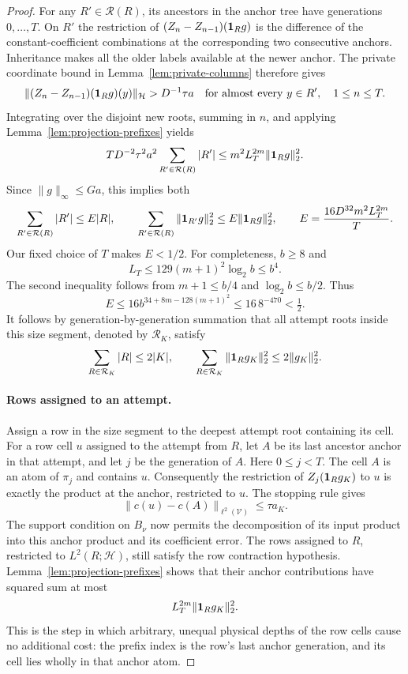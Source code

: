 \begin{proof}
For any $R'\in\mathcal R(R)$, its ancestors in the anchor tree have
generations $0,\ldots,T$.  On $R'$ the restriction of
$(Z_n-Z_{n-1})(\mathbf 1_Rg)$ is the difference of the constant-coefficient
combinations at the corresponding two consecutive anchors.  Inheritance
makes all the older labels available at the newer anchor.  The private
coordinate bound in Lemma~\ref{lem:private-columns} therefore gives
\[
 \|(Z_n-Z_{n-1})(\mathbf 1_Rg)(y)\|_{\mathcal H}
         >D^{-1}\tau a
 \quad\text{for almost every }y\in R',\quad 1\le n\le T.
\]
Integrating over the disjoint new roots, summing in $n$, and applying
Lemma~\ref{lem:projection-prefixes} yields
\[
 T D^{-2}\tau^2a^2\sum_{R'\in\mathcal R(R)}|R'|
        \le m^2L_T^{2m}\|\mathbf 1_Rg\|_2^2.
\]
Since $\|g\|_\infty\le Ga$, this implies both
\[
 \sum_{R'\in\mathcal R(R)}|R'|\le E|R|,
 \qquad
 \sum_{R'\in\mathcal R(R)}\|\mathbf 1_{R'}g\|_2^2
       \le E\|\mathbf 1_Rg\|_2^2,
 \qquad
 E=\frac{16D^{32}m^2L_T^{2m}}{T}.
\]
Our fixed choice of $T$ makes $E<1/2$.  For completeness, $b\ge8$ and
\[
 L_T\le129(m+1)^2\log_2 b\le b^4.
\]
The second inequality follows from $m+1\le b/4$ and
$\log_2b\le b/2$.  Thus
\[
 E\le16b^{34+8m-128(m+1)^2}
       \le16\,8^{-470}<\tfrac12.
\]
It follows by generation-by-generation summation that all attempt roots
inside this size segment, denoted by $\mathcal R_K$, satisfy
\[
 \sum_{R\in\mathcal R_K}|R|\le2|K|,
 \qquad
 \sum_{R\in\mathcal R_K}\|\mathbf 1_Rg_K\|_2^2\le2\|g_K\|_2^2.
\]

\paragraph{Rows assigned to an attempt.}
Assign a row in the size segment to the deepest attempt root containing its
cell.  For a row cell $u$ assigned to the attempt from $R$, let $A$ be its
last ancestor anchor in that attempt, and let $j$ be the generation of $A$.
Here $0\le j<T$.  The cell $A$ is an atom of $\pi_j$ and contains $u$.
Consequently the restriction of $Z_j(\mathbf 1_Rg_K)$ to $u$ is exactly the product
at the anchor, restricted to $u$.  The stopping rule gives
\[
 \|c(u)-c(A)\|_{\ell^2(\mathcal V)}\le\tau a_K.
\]
The support condition on $B_\nu$ now permits the decomposition of its input
product into this anchor product and its coefficient error.  The rows
assigned to $R$, restricted to $L^2(R;\mathcal H)$, still satisfy the row
contraction hypothesis.  Lemma~\ref{lem:projection-prefixes} shows that their
anchor contributions have squared sum at most
\[
 L_T^{2m}\|\mathbf 1_Rg_K\|_2^2.
\]
This is the step in which arbitrary, unequal physical depths of the row
cells cause no additional cost: the prefix index is the row's last anchor
generation, and its cell lies wholly in that anchor atom.


\end{proof}
